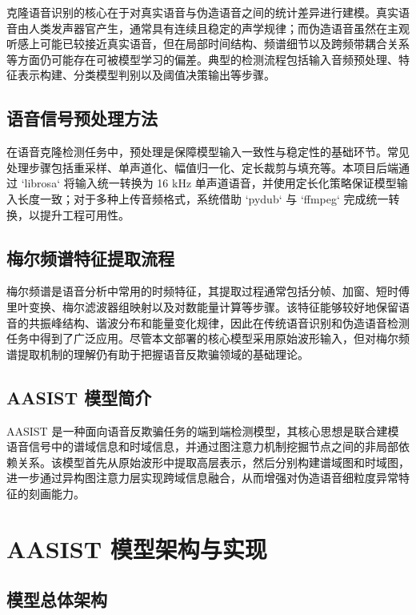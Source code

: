 \documentclass{xduugthesis}
\begin{document}
克隆语音识别的核心在于对真实语音与伪造语音之间的统计差异进行建模。真实语音由人类发声器官产生，通常具有连续且稳定的声学规律；而伪造语音虽然在主观听感上可能已较接近真实语音，但在局部时间结构、频谱细节以及跨频带耦合关系等方面仍可能存在可被模型学习的偏差。典型的检测流程包括输入音频预处理、特征表示构建、分类模型判别以及阈值决策输出等步骤。

\section{语音信号预处理方法}

在语音克隆检测任务中，预处理是保障模型输入一致性与稳定性的基础环节。常见处理步骤包括重采样、单声道化、幅值归一化、定长裁剪与填充等。本项目后端通过 `librosa` 将输入统一转换为 16 kHz 单声道语音，并使用定长化策略保证模型输入长度一致；对于多种上传音频格式，系统借助 `pydub` 与 `ffmpeg` 完成统一转换，以提升工程可用性。

\section{梅尔频谱特征提取流程}

梅尔频谱是语音分析中常用的时频特征，其提取过程通常包括分帧、加窗、短时傅里叶变换、梅尔滤波器组映射以及对数能量计算等步骤。该特征能够较好地保留语音的共振峰结构、谐波分布和能量变化规律，因此在传统语音识别和伪造语音检测任务中得到了广泛应用。尽管本文部署的核心模型采用原始波形输入，但对梅尔频谱提取机制的理解仍有助于把握语音反欺骗领域的基础理论。

\section{AASIST 模型简介}

AASIST 是一种面向语音反欺骗任务的端到端检测模型，其核心思想是联合建模语音信号中的谱域信息和时域信息，并通过图注意力机制挖掘节点之间的非局部依赖关系。该模型首先从原始波形中提取高层表示，然后分别构建谱域图和时域图，进一步通过异构图注意力层实现跨域信息融合，从而增强对伪造语音细粒度异常特征的刻画能力\cite{jung2022aasist,wang2019han}。

\chapter{AASIST 模型架构与实现}

\section{模型总体架构}
\end{document}
